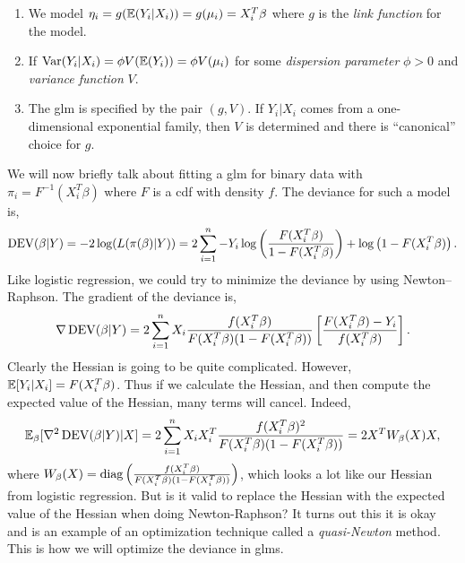 \begin{enumerate}
    \item We  model $\eta_i = g({\mathbb{E}}(Y_i|X_i))=g(\mu_i)  =X_i^T\beta$ where $g$  is the \emph{link function} for the model.
    \item If  $\operatorname{Var}(Y_i|X_i)=\phi V({\mathbb{E}}(Y_i))=\phi V(\mu_i)$ for  some  \emph{dispersion parameter}  $\phi>0$ and \emph{variance function} $V$.
    \item The glm is specified by the pair  $(g,V)$. If   $Y_i|X_i$  comes  from  a  one-dimensional exponential family, then $V$  is  determined and there is ``canonical'' choice  for $g$.
\end{enumerate}

We will now briefly talk about fitting a glm for binary data with $\pi_i = F^{-1}(X_i^T\beta)$ where $F$ is a cdf with density  $f$. The deviance for such a  model is,
\[\operatorname{DEV}(\beta|Y)=-2\log(L(\pi(\beta)|Y)) = 2\sum_{i=1}^n-Y_i\log\left(\frac{F(X_i^T\beta)}{1-F(X_i^T\beta)}\right)+\log\left(1-F(X_i^T\beta)\right).  \]
Like logistic regression, we could try to minimize  the deviance by using Newton--Raphson. The gradient of the deviance is,
\[\nabla \operatorname{DEV}(\beta|Y) = 2\sum_{i=1}^n X_i  \frac{f(X_i^T\beta)}{F(X_i^T\beta)(1-F(X_i^T\beta))}\left[
    \frac{F(X_i^T\beta)-Y_i}{f(X_i^T\beta)}
\right]. \]
Clearly  the Hessian is going to  be quite  complicated. However, ${\mathbb{E}}[Y_i|X_i]  = F(X_i^T\beta)$.  Thus  if we calculate the Hessian, and then  compute the expected value of the Hessian, many terms will cancel.  Indeed,
\[{\mathbb{E}}_{\beta}[\nabla^2\operatorname{DEV}(\beta|Y)|X] =  2\sum_{i=1}^n  X_iX_i^T\frac{f(X_i^T\beta)^2}{F(X_i^T\beta)(1-F(X_i^T\beta))} = 2X^TW_\beta(X)  X,  \]
where $W_\beta(X)  =  \operatorname{diag}\left(
    \frac{f(X_i^T\beta)}{F(X_i^T\beta)(1-F(X_i^T\beta))}
\right)$, which looks a lot like our Hessian from  logistic regression. But is it valid to replace the Hessian with the expected value of the Hessian when doing Newton-Raphson?  It turns  out this it is okay and is an example of an optimization technique called a \emph{quasi-Newton}  method.  This is how we will optimize the deviance in glms. 
